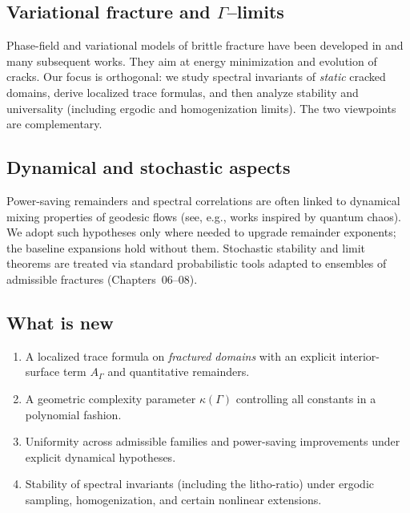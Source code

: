 \subsection{Variational fracture and $\Gamma$–limits}
\label{sub:intro-variational}

Phase-field and variational models of brittle fracture have been developed
in \cite{BourdinFrancfortMarigo2008,Braides2002} and many subsequent works.
They aim at energy minimization and evolution of cracks. Our focus is
orthogonal: we study spectral invariants of \emph{static} cracked domains,
derive localized trace formulas, and then analyze stability and universality
(including ergodic and homogenization limits). The two viewpoints are
complementary.

\subsection{Dynamical and stochastic aspects}
\label{sub:intro-dynamical-stochastic}

Power-saving remainders and spectral correlations are often linked to
dynamical mixing properties of geodesic flows (see, e.g., works inspired by
quantum chaos). We adopt such hypotheses only where needed to upgrade
remainder exponents; the baseline expansions hold without them. Stochastic
stability and limit theorems are treated via standard probabilistic tools
adapted to ensembles of admissible fractures (Chapters~06–08).

\subsection{What is new}
\label{sub:intro-whats-new}

\begin{enumerate}
  \item A localized trace formula on \emph{fractured domains} with an explicit
  interior-surface term $A_\Gamma$ and quantitative remainders.
  \item A geometric complexity parameter $\kappa(\Gamma)$ controlling all
  constants in a polynomial fashion.
  \item Uniformity across admissible families and power-saving improvements
  under explicit dynamical hypotheses.
  \item Stability of spectral invariants (including the litho-ratio) under
  ergodic sampling, homogenization, and certain nonlinear extensions.
\end{enumerate}

